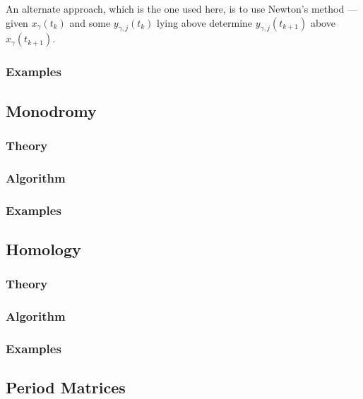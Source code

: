 \documentclass{article}
\begin{document}
An alternate approach, which is the one used here, is to use Newton's
method --- given $x_\gamma(t_k)$ and some $y_{\gamma,j}(t_k)$ lying
above determine $y_{\gamma,j}(t_{k+1})$ above $x_\gamma(t_{k+1})$.

%
\subsubsection{Examples}
%

\subsection{Monodromy}

%
\subsubsection{Theory}
%
%
\subsubsection{Algorithm}
%
%
\subsubsection{Examples}
%

\subsection{Homology}

%
\subsubsection{Theory}
%
%
\subsubsection{Algorithm}
%
%
\subsubsection{Examples}
%

\subsection{Period Matrices}
\end{document}
